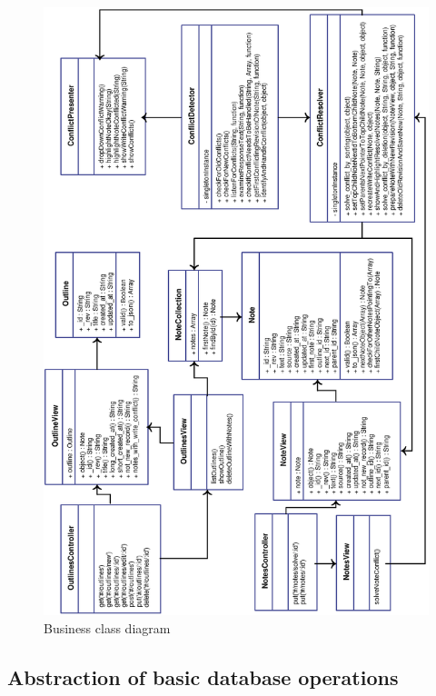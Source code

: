 \medskip
\begin{figure}[H] 
  \begin{center}
  \includegraphics[width=\textwidth]{grafik/Fachklassendiagramm} 
  \end{center}
  \caption{Business class diagram}
  \label{figure:fachklassen}
\end{figure}





\subsection{Abstraction of basic database operations}

